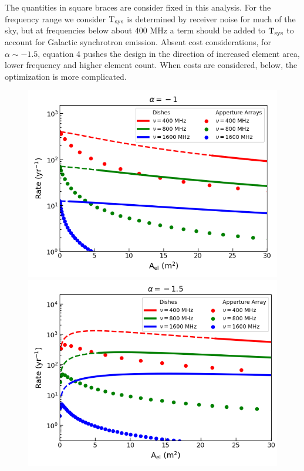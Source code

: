 \documentclass[fleqn,usenatbib]{mnras}
\begin{document}
The quantities in square braces are consider fixed in this analysis.  
For the frequency range we consider ${\rm T_{sys}}$ is determined by receiver noise
for much of the sky, but at frequencies below
about 400 MHz a term should be added to ${\rm T_{sys}}$ to account for Galactic synchrotron emission.
Absent cost considerations, for $\alpha \sim -1.5$, equation 4 pushes the design in the direction of increased element area, lower frequency and higher element count. When costs are considered, below, the optimization is more complicated.

\begin{figure}
   \includegraphics[width=1\linewidth,height=0.82\linewidth]{ratevsaeff_alpha1.png}

   \includegraphics[width=1\linewidth,height=0.82\linewidth]{ratevsaeff_alpha15.png}


\end{figure}
\end{document}
